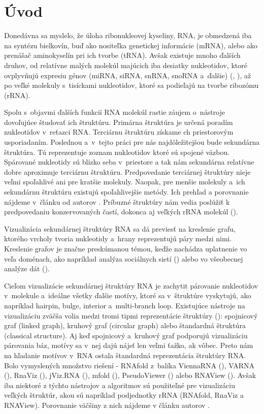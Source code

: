 
\chapter*{Úvod}

Donedávna sa myslelo, že úloha ribonukleovej kyseliny, RNA, je obmedzená
iba na syntézu bielkovín, buď ako nositeľka genetickej informácie (mRNA),
alebo ako prenášač aminokyselín pri ich tvorbe (tRNA).
Avšak existuje mnoho ďalších druhov, od relatívne malých molekúl majúcich
iba desiatky nukleotidov, ktoré ovplyvňujú expresiu génov
(miRNA, siRNA, snRNA, snoRNA a~ďalšie) (\citet{RNA_MI_SI}, \citet{RNA_SN_SNO}),
až po veľké molekuly s~tisíckami nukleotidov, ktoré sa podieľajú na tvorbe ribozómu (rRNA).

Spolu s~objavmi ďalších funkcií RNA molekúl rastie záujem o~nástroje dovoľujúce
študovať ich štruktúru.
Primárna štruktúra je určená poradím nukleotidov v~reťazci RNA.
Terciárnu štruktúru získame ch priestorovým usporiadaním.
Poslednou a~v~tejto práci pre nás najdôležitejšou
bude sekundárna štruktúra. Tú reprezentuje zoznam nukleotidov ktoré sú spojené väzbou.
Spárované nukleotidy sú blízko seba v~priestore a tak nám sekundárna relatívne
dobre aproximuje terciárnu štruktúru. Predpovedanie terciárnej štruktúry nieje veľmi
spoľahlivé ani pre kratšie molekuly. Naopak, pre menšie molekuly a~ich  sekundárnu
štruktúru existujú spoľahlivejšie metódy. Ich prehľad a porovnanie nájdeme v~článku
od autorov \citet{SEC_STR_PREDICT_TOOLS}.
Príbuzné štruktúry nám vedia poslúžiť k predpovedaniu konzervovaných častí, dokonca
aj veľkých rRNA molekúl (\citet{SEC_STR_PREDICTION}).

Vizualizácia sekundárnej štruktúry RNA sa dá previesť na kreslenie grafu,
ktorého vrcholy tvoria nukleotidy a~hrany reprezentujú páry medzi nimi.
Kreslenie grafov je značne preskúmanou témou, keďže nachádza uplatnenie vo veľa
doménach, ako napríklad analýza sociálnych sietí (\citet{SOCIAL_NETWORK_ANALYSIS})
alebo vo všeobecnej analýze dát (\citet{GRAPH_DRAWING}).

Cieľom vizualizácie sekundárnej štruktúry RNA je zachytit párovanie nukleotidov
v~molekule a~ideálne všetky ďalšie motívy, ktoré sa v~štruktúre vyskytujú,
ako napríklad hairpin, bulge, interior a~multi-branch loop.
Existujúce nástroje na vizualizáciu zväčša volia medzi tromi tipmi reprezentácie
štruktúry (\citet{JVIZ}): spojnicový graf (linked graph), kruhový graf (circular graph)
alebo štandardná štruktúra (classical structure).
Aj keď spojnicový a~kruhový graf podporujú vizualizáciu párovania báz, motívy
sa v~nej dajú nájsť len veľmi ťažko, ak vôbec.
Preto nám na hľadanie motívov v~RNA ostala štandardná reprezentácia štruktúry RNA.
Bolo vymyslených množstvo riešení -
RNAfold z~balíka ViennaRNA (\citet{VIENNA_RNA}), VARNA (\citet{VARNA}),
RnaViz (\citet{RNA_VIZ}), jViz.RNA (\citet{JVIZ}), mfold (\citet{MFOLD}),
PseudoViewer (\citet{PSEUDOVIEWER}) alebo RNAView (\citet{RNAVIEW}).
Avšak iba niektoré z týchto nástrojov a algoritmov sú použiteľné pre vizualizáciu
veľkých štruktúr, akou sú napríklad podjednotky rRNA (RNAfold, RnaViz a RNAView).
Porovnanie väčšiny z nich nájdeme v článku autorov \citet{DRAWING_COMPARISION}.

